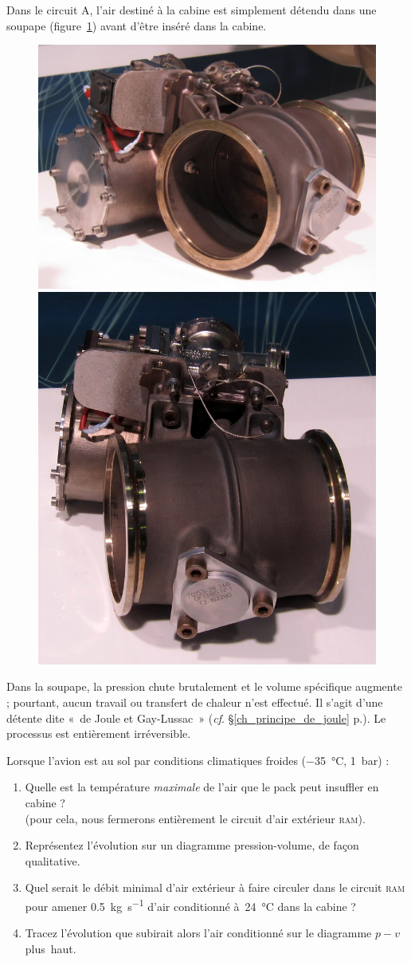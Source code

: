 	Dans le circuit A, l’air destiné à la cabine est simplement détendu dans une soupape (figure~\ref{fig_soupape}) avant d’être inséré dans la cabine.

	\begin{figure}
		\begin{center}
			\includegraphics[height=.2\textwidth]{images/outflow_valve_1.jpg}
			\includegraphics[height=.2\textwidth]{images/outflow_valve_2.jpg}
		\end{center}
		\label{fig_soupape}
	\end{figure}
	
	Dans la soupape, la pression chute brutalement et le volume spécifique augmente ; pourtant, aucun travail ou transfert de chaleur n’est effectué. Il s’agit d’une détente dite «~de Joule et Gay-Lussac~» (\textit{cf}. \S\ref{ch_principe_de_joule} p.\pageref{ch_principe_de_joule}). Le processus est entièrement irréversible.
	
	Lorsque l’avion est au sol par conditions climatiques froides (\SI{-35}{\degreeCelsius}, \SI{1}{\bar}) :
	
	\begin{enumerate}
		\item Quelle est la température \emph{maximale} de l’air que le pack peut insuffler en cabine ?\\
			(pour cela, nous fermerons entièrement le circuit d’air extérieur \textsc{ram}).
		\item Représentez l’évolution sur un diagramme pression-volume, de façon qualitative.
		\item Quel serait le débit minimal d’air extérieur à faire circuler dans le circuit \textsc{ram} pour amener \SI[per-mode=symbol]{0,5}{\kilogram\per\second} d’air conditionné à~\SI{24}{\degreeCelsius} dans la cabine ?
		\item Tracez l’évolution que subirait alors l’air conditionné sur le diagramme $p-v$ plus~haut.
	\end{enumerate}



